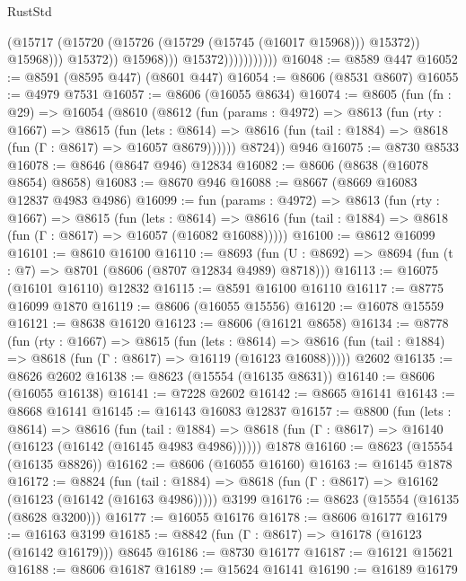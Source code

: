 \begin{lexlean}{RustStd}
\begin{coremodule}
                                        (@15717
                                          (@15720 (@15726 (@15729 (@15745 (@16017 @15968))) @15372))
                                          @15968)))
                                    @15372))
                                @15968)))
                          @15372)))))))))))
@16048 := @8589 @447
@16052 := @8591 (@8595 @447) (@8601 @447)
@16054 := @8606 (@8531 @8607)
@16055 := @4979 @7531
@16057 := @8606 (@16055 @8634)
@16074 := @8605
    (fun (fn : @29) =>
    @16054
      (@8610
        (@8612
          (fun (params : @4972) =>
          @8613
            (fun (rty : @1667) =>
            @8615
              (fun (lets : @8614) =>
              @8616 (fun (tail : @1884) => @8618 (fun (Γ : @8617) => @16057 @8679))))))
        @8724))
    @946
@16075 := @8730 @8533
@16078 := @8646 (@8647 @946) @12834
@16082 := @8606 (@8638 (@16078 @8654) @8658)
@16083 := @8670 @946
@16088 := @8667 (@8669 @16083 @12837 @4983 @4986)
@16099 := fun (params : @4972) =>
  @8613
    (fun (rty : @1667) =>
    @8615
      (fun (lets : @8614) =>
      @8616 (fun (tail : @1884) => @8618 (fun (Γ : @8617) => @16057 (@16082 @16088)))))
@16100 := @8612 @16099
@16101 := @8610 @16100
@16110 := @8693
    (fun (U : @8692) => @8694 (fun (t : @7) => @8701 (@8606 (@8707 @12834 @4989) @8718)))
@16113 := @16075 (@16101 @16110) @12832
@16115 := @8591 @16100 @16110
@16117 := @8775 @16099 @1870
@16119 := @8606 (@16055 @15556)
@16120 := @16078 @15559
@16121 := @8638 @16120
@16123 := @8606 (@16121 @8658)
@16134 := @8778
    (fun (rty : @1667) =>
    @8615
      (fun (lets : @8614) =>
      @8616 (fun (tail : @1884) => @8618 (fun (Γ : @8617) => @16119 (@16123 @16088)))))
    @2602
@16135 := @8626 @2602
@16138 := @8623 (@15554 (@16135 @8631))
@16140 := @8606 (@16055 @16138)
@16141 := @7228 @2602
@16142 := @8665 @16141
@16143 := @8668 @16141
@16145 := @16143 @16083 @12837
@16157 := @8800
    (fun (lets : @8614) =>
    @8616
      (fun (tail : @1884) =>
      @8618 (fun (Γ : @8617) => @16140 (@16123 (@16142 (@16145 @4983 @4986))))))
    @1878
@16160 := @8623 (@15554 (@16135 @8826))
@16162 := @8606 (@16055 @16160)
@16163 := @16145 @1878
@16172 := @8824
    (fun (tail : @1884) => @8618 (fun (Γ : @8617) => @16162 (@16123 (@16142 (@16163 @4986)))))
    @3199
@16176 := @8623 (@15554 (@16135 (@8628 @3200)))
@16177 := @16055 @16176
@16178 := @8606 @16177
@16179 := @16163 @3199
@16185 := @8842 (fun (Γ : @8617) => @16178 (@16123 (@16142 @16179))) @8645
@16186 := @8730 @16177
@16187 := @16121 @15621
@16188 := @8606 @16187
@16189 := @15624 @16141
@16190 := @16189 @16179

\end{coremodule}
\end{lexlean}
